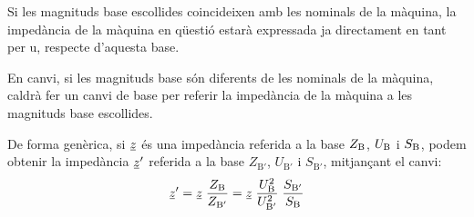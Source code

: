 Si les magnituds base escollides coincideixen amb les nominals de la màquina,
la impedància de la màquina en qüestió estarà expressada ja directament en tant per u, respecte d'aquesta base.

 En canvi, si les magnituds base són diferents de les nominals de la màquina, caldrà fer un canvi de base per referir la impedància de la màquina a les magnituds base escollides.

De forma genèrica, si $\cmplx{z}$ és una impedància referida a la base $Z_\mathrm{B}$, $U_\mathrm{B}$ i $S_\mathrm{B}$, podem obtenir la impedància $\cmplx{z}'$ referida a la base $Z_{\text{B}'}$, $U_{\text{B}'}$ i $S_{\text{B}'}$, mitjançant el canvi:
\begin{equation}
   \cmplx{z}' = \cmplx{z} \; \frac{Z\ped{B}}{Z_{\text{B}'}} = \cmplx{z} \; \frac{U\ped{B}^2}{U_{\text{B}'}^2} \; \frac{S_{\text{B}'}}{S\ped{B}}\label{eq_pu_canvi_base}
\end{equation}


